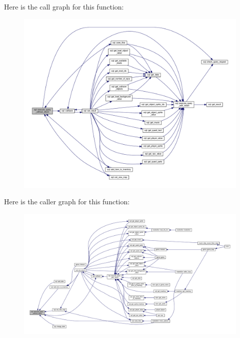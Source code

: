 Here is the call graph for this function\+:
\nopagebreak
\begin{figure}[H]
\begin{center}
\leavevmode
\includegraphics[width=350pt]{classsql_ac70e1da6d9e49f114bcf639fd1e6f86c_cgraph}
\end{center}
\end{figure}
Here is the caller graph for this function\+:
\nopagebreak
\begin{figure}[H]
\begin{center}
\leavevmode
\includegraphics[width=350pt]{classsql_ac70e1da6d9e49f114bcf639fd1e6f86c_icgraph}
\end{center}
\end{figure}
\mbox{\label{classsql_a29fe43df701460704744049aec28d58e}} 
